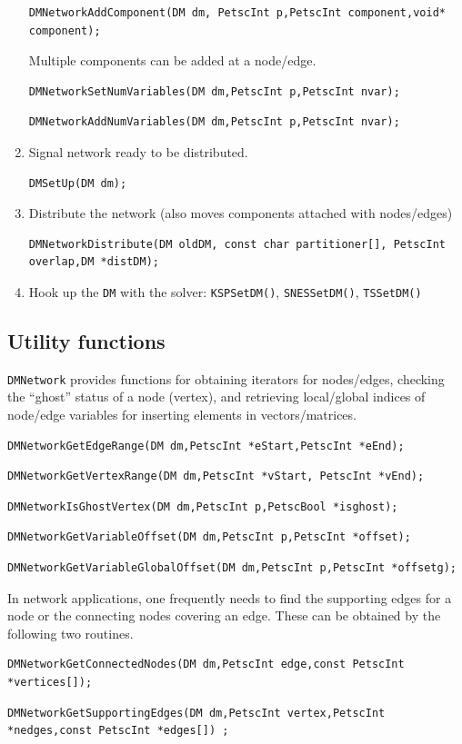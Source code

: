 \begin{enumerate}
\begin{lstlisting}
DMNetworkAddComponent(DM dm, PetscInt p,PetscInt component,void* component);
\end{lstlisting}
  Multiple components can be added at a node/edge.
\begin{lstlisting}
DMNetworkSetNumVariables(DM dm,PetscInt p,PetscInt nvar);
\end{lstlisting}
\begin{lstlisting}
DMNetworkAddNumVariables(DM dm,PetscInt p,PetscInt nvar);
\end{lstlisting}
  \item Signal network ready to be distributed.
\begin{lstlisting}
DMSetUp(DM dm);
\end{lstlisting}
  \item Distribute the network (also moves components attached with nodes/edges)
\begin{lstlisting}
DMNetworkDistribute(DM oldDM, const char partitioner[], PetscInt overlap,DM *distDM);
\end{lstlisting}
\item Hook up the \lstinline{DM} with the solver: \lstinline{KSPSetDM()}, \lstinline{SNESSetDM()}, \lstinline{TSSetDM()}
\end{enumerate}

\subsection{Utility functions}
  \lstinline{DMNetwork} provides functions for obtaining iterators for nodes/edges, checking the ``ghost''
  status of a node (vertex), and retrieving local/global indices of node/edge variables for inserting
  elements in vectors/matrices.
\begin{lstlisting}
DMNetworkGetEdgeRange(DM dm,PetscInt *eStart,PetscInt *eEnd);
\end{lstlisting}
\begin{lstlisting}
DMNetworkGetVertexRange(DM dm,PetscInt *vStart, PetscInt *vEnd);
\end{lstlisting}
\begin{lstlisting}
DMNetworkIsGhostVertex(DM dm,PetscInt p,PetscBool *isghost);
\end{lstlisting}
\begin{lstlisting}
DMNetworkGetVariableOffset(DM dm,PetscInt p,PetscInt *offset);
\end{lstlisting}
\begin{lstlisting}
DMNetworkGetVariableGlobalOffset(DM dm,PetscInt p,PetscInt *offsetg);
\end{lstlisting}
In network applications, one frequently needs to find the supporting edges for a node or
the connecting nodes covering an edge. These can be obtained by the following two routines.
\begin{lstlisting}
DMNetworkGetConnectedNodes(DM dm,PetscInt edge,const PetscInt *vertices[]);
\end{lstlisting}
\begin{lstlisting}
DMNetworkGetSupportingEdges(DM dm,PetscInt vertex,PetscInt *nedges,const PetscInt *edges[]) ;
\end{lstlisting}

